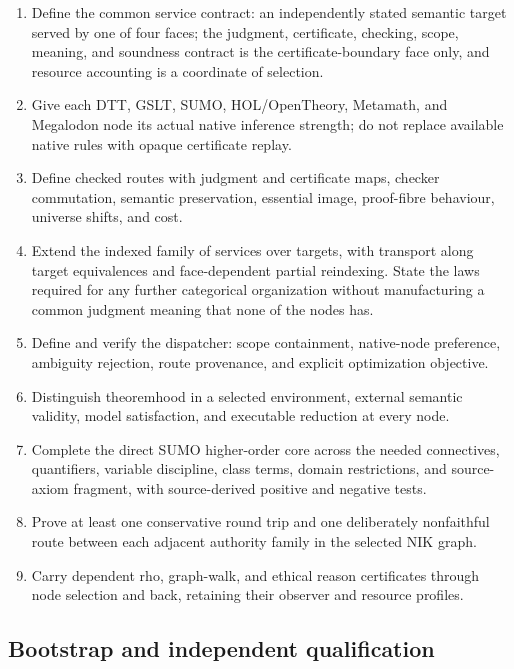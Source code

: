 \documentclass[11pt]{article}
\theoremstyle{definition}
\theoremstyle{remark}
\begin{document}
\begin{enumerate}
\item Define the common service contract: an independently stated semantic
  target served by one of four faces; the judgment, certificate, checking,
  scope, meaning, and soundness contract is the certificate-boundary face
  only, and resource accounting is a coordinate of selection.
\item Give each DTT, GSLT, SUMO, HOL/OpenTheory, Metamath, and Megalodon node its
  actual native inference strength; do not replace available native rules with
  opaque certificate replay.
\item Define checked routes with judgment and certificate maps, checker
  commutation, semantic preservation, essential image, proof-fibre behaviour,
  universe shifts, and cost.
\item Extend the indexed family of services over targets, with transport along
  target equivalences and face-dependent partial reindexing. State the laws
  required for any further categorical organization without manufacturing a
  common judgment meaning that none of the nodes has.
\item Define and verify the dispatcher: scope containment, native-node
  preference, ambiguity rejection, route provenance, and explicit optimization
  objective.
\item Distinguish theoremhood in a selected environment, external semantic
  validity, model satisfaction, and executable reduction at every node.
\item Complete the direct SUMO higher-order core across the needed connectives,
  quantifiers, variable discipline, class terms, domain restrictions, and
  source-axiom fragment, with source-derived positive and negative tests.
\item Prove at least one conservative round trip and one deliberately
  nonfaithful route between each adjacent authority family in the selected NIK
  graph.
\item Carry dependent rho, graph-walk, and ethical reason certificates through
  node selection and back, retaining their observer and resource profiles.
\end{enumerate}

\subsection{Bootstrap and independent qualification}
\end{document}

